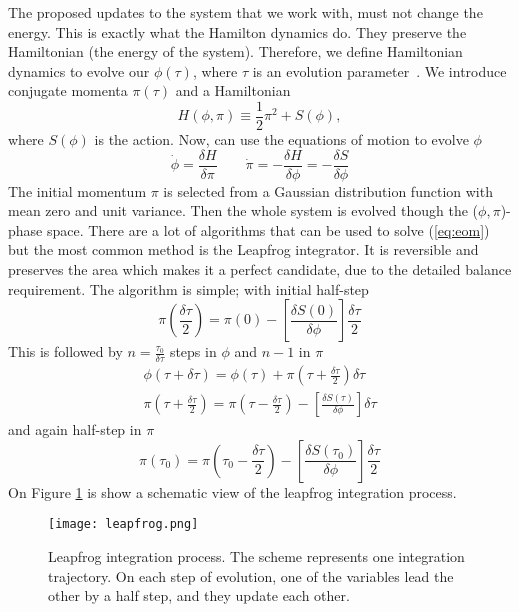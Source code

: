 The proposed updates to the system that we work with, must not change the energy. This is exactly what the Hamilton dynamics do. They preserve the Hamiltonian (the energy of the system). Therefore, we define Hamiltonian dynamics to evolve our $\phi(\tau)$, where $\tau$ is an evolution parameter~\cite{hmc}. We introduce conjugate momenta $\pi(\tau)$ and a Hamiltonian 
\begin{equation}
    H(\phi,\pi) \equiv \frac{1}{2}\pi^2 + S(\phi),
\end{equation}
where $S(\phi)$ is the action. Now, can use the equations of motion to evolve $\phi$
\begin{equation}
    \dot{\phi} = \frac{\delta H}{\delta \pi} \qquad \dot{\pi} = - \frac{\delta H}{\delta \phi} = - \frac{\delta S}{\delta \phi}
    \label{eq:eom}
\end{equation}
The initial momentum $\pi$ is selected from a Gaussian distribution function with mean zero and unit variance. Then the whole system is evolved though the ($\phi,\pi$)-phase space. There are a lot of algorithms that can be used to solve (\ref{eq:eom}) but the most common method is the Leapfrog integrator. It is reversible and preserves the area which makes it a perfect candidate, due to the detailed balance requirement. The algorithm is simple; with initial half-step
\begin{equation}
    \pi\left(\frac{\delta\tau}{2}\right) = \pi\left(0\right) - \left[ \frac{\delta S(0)}{\delta\phi} \right] \frac{\delta\tau}{2}
\end{equation}
This is followed by $n=\frac{\tau_0}{\delta\tau}$ steps in $\phi$ and $n-1$ in $\pi$
\begin{equation}
    \begin{aligned}
        \phi(\tau+\delta\tau) = \phi(\tau) + \pi(\tau+\frac{\delta\tau}{2})\delta\tau
        \\
        \pi(\tau+\frac{\delta\tau}{2}) = \pi(\tau-\frac{\delta\tau}{2}) - \left[ \frac{\delta S(\tau)}{\delta\phi} \right] \delta\tau
    \end{aligned}
\end{equation}
and again half-step in $\pi$
\begin{equation}
    \pi(\tau_0) = \pi(\tau_0-\frac{\delta\tau}{2}) - \left[ \frac{\delta S(\tau_0)}{\delta\phi} \right] \frac{\delta\tau}{2}
\end{equation}
On Figure \ref{fig:leapfrog} is show a schematic view of the leapfrog integration process.
\begin{figure}[htbp]
    \centerline{\texttt{[image: leapfrog.png]}}
    \caption{Leapfrog integration process. The scheme represents one integration trajectory. On each step of evolution, one of the variables lead the other by a half step, and they update each other. %
    }
    \label{fig:leapfrog}
\end{figure}

